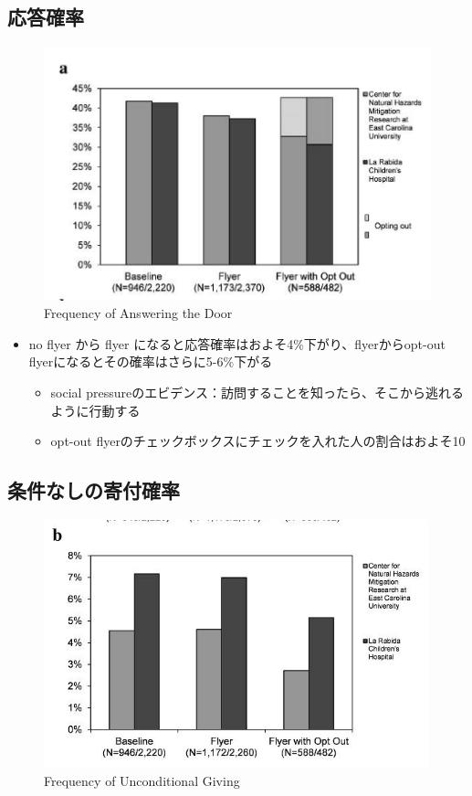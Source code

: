 \documentclass[../root]{subfiles}
\begin{document}
    \subsection{応答確率}

    \begin{figure}[h]
        \centering
        \includegraphics[width = .5\linewidth]{0821kato/fig5_2.png}
        \caption{Frequency of Answering the Door}
        \label{}
    \end{figure}

    \begin{itemize}
        \item no flyer から flyer になると応答確率はおよそ4\%下がり、flyerからopt-out flyerになるとその確率はさらに5-6\%下がる
        \begin{itemize}
            \item social pressureのエビデンス：訪問することを知ったら、そこから逃れるように行動する
            \item opt-out flyerのチェックボックスにチェックを入れた人の割合はおよそ10%
        \end{itemize}
    \end{itemize}

    \subsection{条件なしの寄付確率}

    \begin{figure}[h]
        \centering
        \includegraphics[width = .5\linewidth]{0821kato/fig6_2.png}
        \caption{Frequency of Unconditional Giving}
        \label{}
    \end{figure}
\end{document}
